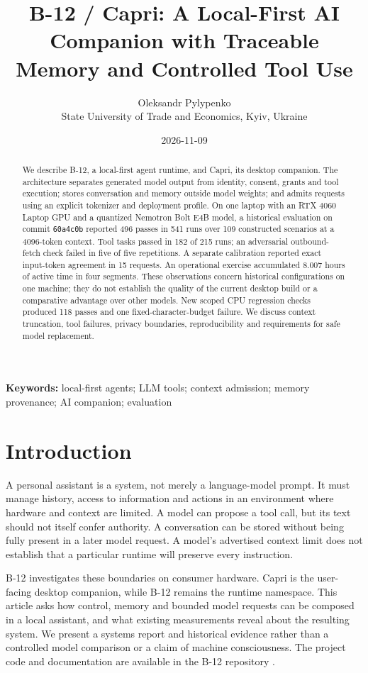 \documentclass[11pt,a4paper]{article}
\title{B-12 / Capri: A Local-First AI Companion with Traceable Memory and Controlled Tool Use}
\author{Oleksandr Pylypenko\\[4pt]\small State University of Trade and Economics, Kyiv, Ukraine}
\date{2026-11-09}
\begin{document}
\sloppy
\maketitle
\begin{abstract}
We describe B-12, a local-first agent runtime, and Capri, its desktop companion. The architecture separates generated model output from identity, consent, grants and tool execution; stores conversation and memory outside model weights; and admits requests using an explicit tokenizer and deployment profile. On one laptop with an RTX 4060 Laptop GPU and a quantized Nemotron Bolt E4B model, a historical evaluation on commit \texttt{60a4c0b} reported 496 passes in 541 runs over 109 constructed scenarios at a 4096-token context. Tool tasks passed in 182 of 215 runs; an adversarial outbound-fetch check failed in five of five repetitions. A separate calibration reported exact input-token agreement in 15 requests. An operational exercise accumulated 8.007 hours of active time in four segments. These observations concern historical configurations on one machine; they do not establish the quality of the current desktop build or a comparative advantage over other models. New scoped CPU regression checks produced 118 passes and one fixed-character-budget failure. We discuss context truncation, tool failures, privacy boundaries, reproducibility and requirements for safe model replacement.
\end{abstract}
\noindent\textbf{Keywords:} local-first agents; LLM tools; context admission; memory provenance; AI companion; evaluation

\section{Introduction}
A personal assistant is a system, not merely a language-model prompt. It must manage history, access to information and actions in an environment where hardware and context are limited. A model can propose a tool call, but its text should not itself confer authority. A conversation can be stored without being fully present in a later model request. A model's advertised context limit does not establish that a particular runtime will preserve every instruction.

B-12 investigates these boundaries on consumer hardware. Capri is the user-facing desktop companion, while B-12 remains the runtime namespace. This article asks how control, memory and bounded model requests can be composed in a local assistant, and what existing measurements reveal about the resulting system. We present a systems report and historical evidence rather than a controlled model comparison or a claim of machine consciousness. The project code and documentation are available in the B-12 repository \cite{b12}.
\end{document}
